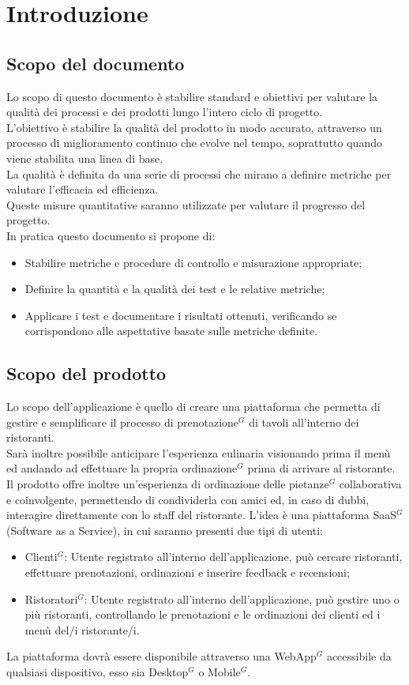 
\section{Introduzione}
\subsection{Scopo del documento}
Lo scopo di questo documento è stabilire standard e obiettivi per valutare la qualità
dei processi e dei prodotti lungo l'intero ciclo di progetto. \\
L'obiettivo è stabilire la qualità del prodotto in modo accurato, attraverso un processo di miglioramento continuo che evolve nel tempo, soprattutto quando viene stabilita
una linea di base. \\
La qualità è definita da una serie di processi che mirano a definire metriche per valutare
l'efficacia ed efficienza. \\
Queste misure quantitative saranno utilizzate per valutare il progresso del progetto.\\
In pratica questo documento si propone di:
\begin{itemize}
    \item Stabilire metriche e procedure di controllo e misurazione appropriate;
    \item Definire la quantità e la qualità dei test e le relative metriche;
    \item Applicare i test e documentare i risultati ottenuti, verificando se corrispondono alle aspettative basate sulle metriche definite.
\end{itemize}

\subsection{Scopo del prodotto}
Lo scopo dell'applicazione è quello di creare una piattaforma che permetta di gestire e semplificare
il processo di prenotazione$^{G}$ di tavoli all'interno dei ristoranti. \\
Sarà inoltre possibile anticipare l'esperienza culinaria visionando prima il menù ed
andando ad effettuare la propria ordinazione$^{G}$ prima di arrivare al ristorante. \\
Il prodotto offre inoltre un’esperienza di ordinazione delle pietanze$^{G}$ collaborativa e coinvolgente,
permettendo di condividerla con amici ed, in caso di dubbi, interagire direttamente con lo staff del ristorante.
L’idea è una piattaforma SaaS$^{G}$ (Software as a Service), in cui saranno presenti due tipi di utenti:
\begin{itemize}
    \item Clienti$^{G}$: Utente registrato all’interno dell’applicazione, può cercare ristoranti, effettuare prenotazioni, ordinazioni e inserire feedback e recensioni;
    \item Ristoratori$^{G}$: Utente registrato all’interno dell’applicazione, può gestire uno o più ristoranti, controllando le prenotazioni e le ordinazioni dei clienti ed i menù del/i ristorante/i.
\end{itemize}
La piattaforma dovrà essere disponibile attraverso una WebApp$^{G}$ accessibile da qualsiasi dispositivo, esso sia Desktop$^{G}$ o Mobile$^{G}$.
